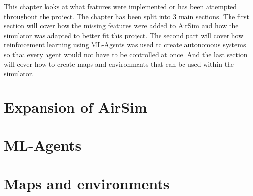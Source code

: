 This chapter looks at what features were implemented or has been attempted throughout the project. The chapter has been split into 3 main sections. The first section will cover how the missing features were added to AirSim and how the simulator was adapted to better fit this project. The second part will cover how reinforcement learning using ML-Agents was used to create autonomous systems so that every agent would not have to be controlled at once. And the last section will cover how to create maps and environments that can be used within the simulator. 

\section{Expansion of AirSim} \label{06:airsim}


\section{ML-Agents} \label{MLAgents}


\section{Maps and environments}



